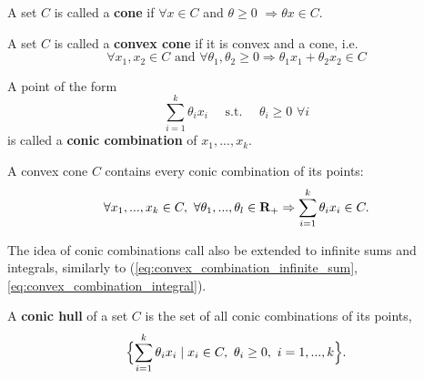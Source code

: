 
\begin{Definition}
  A set $C$ is called a \textbf{cone} if $\forall x\in C$ and $\theta\ge 0$
  $\Rightarrow \theta x\in C$.
\end{Definition}

\begin{Definition}
  A set $C$ is called a \textbf{convex cone} if it is convex and a cone, i.e.
  \begin{equation*}
    \forall x_1,x_2\in C\text{ and }\forall\theta_1,\theta_2\ge 0\Rightarrow
    \theta_1x_1+\theta_2x_2\in C
  \end{equation*}
\end{Definition}

\begin{Definition}
  A point of the form
  \begin{equation*}
    \sum_{i=1}^k\theta_ix_i\quad\text{ s.t. }\quad\theta_i\ge 0\,\,\forall i
  \end{equation*}
  is called a \textbf{conic combination} of $x_1,...,x_k$.
\end{Definition}

\begin{Fact}
  A convex cone $C$ contains every conic combination of its points:
  \begin{equation*}
    \forall x_1,...,x_k\in C,\,\,\forall
    \theta_1,...,\theta_l\in\textbf{R}_+\Rightarrow\sum_{i=1}^k\theta_ix_i\in C.
  \end{equation*}
\end{Fact}

\begin{Fact}
  The idea of conic combinations call also be extended to infinite sums and
  integrals, similarly to (\ref{eq:convex_combination_infinite_sum},
  \ref{eq:convex_combination_integral}).
\end{Fact}

\begin{Definition}
  A \textbf{conic hull} of a set $C$ is the set of all conic combinations of its
  points,
  \begin{equation*}
    \Bigl\{\sum_{i=1}^k\theta_ix_i \mid x_i\in C,\,\,\theta_i\ge 0,\,\,i=1,...,k\Bigr\}.
  \end{equation*}
\end{Definition}

